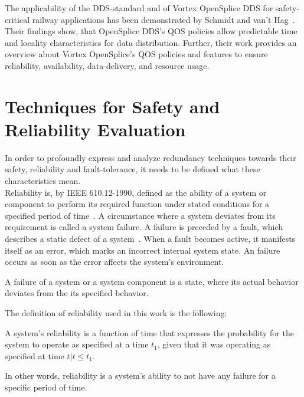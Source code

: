 The applicability of the \gls*{DDS}-standard and of Vortex OpenSplice \gls*{DDS} for safety-critical railway applications has been demonstrated by Schmidt and van't Hag~\cite{SchmidtMissionCriticalChallenges}.
Their findings show, that OpenSplice \gls*{DDS}'s \gls*{QOS} policies allow predictable time and locality characteristics for data distribution.
Further, their work provides an overview about Vortex OpenSplice's \gls*{QOS} policies and features to ensure reliability, availability, data-delivery, and resource usage.

\section{Techniques for Safety and Reliability Evaluation}
\label{sec:techniquesSafetyReliability}
In order to profoundly express and analyze redundancy techniques towards their safety, reliability and fault-tolerance, it needs to be defined what these characteristics mean.
\\

Reliability is, by IEEE 610.12-1990, defined as the ability of a system or component to perform its required function under stated conditions for a specified period of time~\cite{ieee610.12}.
A circumstance where a system deviates from its requirement is called a system failure.
A failure is preceded by a fault, which describes a static defect of a system~\cite{AmmannOffutt2016}.
When a fault becomes active, it manifests itself as an error, which marks an incorrect internal system state.
An failure occurs as soon as the error affects the system's environment.

\begin{definition}
A failure of a system or a system component is a state, where its actual behavior deviates from the its specified behavior.
\end{definition}

The definition of reliability used in this work is the following:

\begin{definition}
\label{def:reliability}
A system's reliability is a function of time that expresses the probability for the system to operate as specified at a time $t_1$, given that it was operating as specified at time $t | t \leq t_1$.
\end{definition}

In other words, reliability is a system's ability to not have any failure for a specific period of time.


